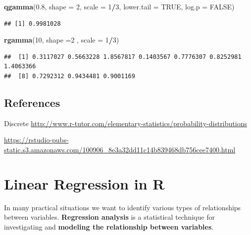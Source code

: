 \documentclass[]{book}
\newenvironment{Shaded}{\begin{snugshade}}{\end{snugshade}}
\newcommand{\DataTypeTok}[1]{\textcolor[rgb]{0.13,0.29,0.53}{#1}}
\newcommand{\DecValTok}[1]{\textcolor[rgb]{0.00,0.00,0.81}{#1}}
\newcommand{\FloatTok}[1]{\textcolor[rgb]{0.00,0.00,0.81}{#1}}
\newcommand{\KeywordTok}[1]{\textcolor[rgb]{0.13,0.29,0.53}{\textbf{#1}}}
\newcommand{\NormalTok}[1]{#1}
\newcommand{\OperatorTok}[1]{\textcolor[rgb]{0.81,0.36,0.00}{\textbf{#1}}}
\newcommand{\OtherTok}[1]{\textcolor[rgb]{0.56,0.35,0.01}{#1}}
\begin{document}
\begin{Shaded}
\begin{Highlighting}[]
\KeywordTok{qgamma}\NormalTok{(}\FloatTok{0.8}\NormalTok{, }\DataTypeTok{shape =} \DecValTok{2}\NormalTok{,  }\DataTypeTok{scale =} \DecValTok{1}\OperatorTok{/}\DecValTok{3}\NormalTok{, }\DataTypeTok{lower.tail =} \OtherTok{TRUE}\NormalTok{,}
       \DataTypeTok{log.p =} \OtherTok{FALSE}\NormalTok{)}
\end{Highlighting}
\end{Shaded}

\begin{verbatim}
## [1] 0.9981028
\end{verbatim}

\begin{Shaded}
\begin{Highlighting}[]
\KeywordTok{rgamma}\NormalTok{(}\DecValTok{10}\NormalTok{, }\DataTypeTok{shape =}\DecValTok{2}\NormalTok{ , }\DataTypeTok{scale =} \DecValTok{1}\OperatorTok{/}\DecValTok{3}\NormalTok{)}
\end{Highlighting}
\end{Shaded}

\begin{verbatim}
##  [1] 0.3117027 0.5663228 1.8567817 0.1403567 0.7776307 0.8252981 1.4063366
##  [8] 0.7292312 0.9434481 0.9001169
\end{verbatim}

\newpage

\hypertarget{references}{%
\section{References}\label{references}}

Discrete
\url{http://www.r-tutor.com/elementary-statistics/probability-distributions}

\url{https://rstudio-pubs-static.s3.amazonaws.com/100906_8e3a32dd11c14b839468db756cee7400.html}

\hypertarget{linear-regression-in-r}{%
\chapter*{Linear Regression in R}\label{linear-regression-in-r}}


In many practical situations we want to identify various types of relationships between variables. \textbf{Regression analysis} is a statistical technique for investigating and \textbf{modeling the relationship between variables}.
\end{document}

